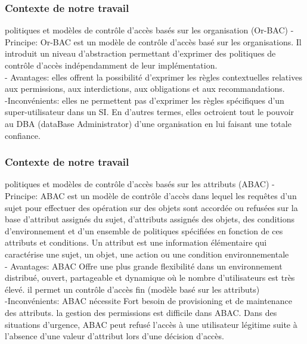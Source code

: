 \documentclass[10pt]{beamer}
\begin{document}
\begin{frame}
 \frametitle{Contexte de notre travail}
  \begin{block}{ politiques et modèles de contrôle d'accès basés sur les organisation (Or-BAC)}
    - Principe: Or-BAC est un modèle de contrôle d'accès basé sur les organisations. Il introduit un niveau d'abstraction permettant d'exprimer des politiques de contrôle d'accès indépendamment de leur implémentation. \\ 
    - Avantages: elles offrent la possibilité d'exprimer les règles contextuelles relatives aux permissions, aux interdictions, aux obligations et aux recommandations.\\
    -Inconvénients: elles ne permettent pas d'exprimer les règles spécifiques d'un super-utilisateur dans un SI. En d'autres termes, elles octroient tout le pouvoir au DBA (dataBase Administrator) d'une organisation en lui faisant une totale confiance. 
  \end{block}
\end{frame}

\begin{frame}
 \frametitle{Contexte de notre travail}
  \begin{block}{ politiques et modèles de contrôle d'accès basés sur les attributs (ABAC)}
    - Principe: ABAC est un modèle de contrôle d'accès dans lequel les requêtes d'un sujet pour effectuer des opération sur des objets sont accordée ou refusées sur la base d'attribut assignés du sujet, d'attributs assignés des objets, des conditions d'environnement et d'un ensemble de politiques spécifiées en fonction de ces attributs et conditions. Un attribut est une information élémentaire qui caractérise une sujet, un objet, une action ou une condition environnementale\\
    - Avantages: ABAC Offre une plus grande flexibilité dans un environnement distribué, ouvert, partageable et dynamique où le nombre d'utilisateurs est très élevé. il permet un contrôle d'accès fin (modèle basé sur les attributs)\\
    -Inconvénients: ABAC nécessite Fort besoin de provisioning et de maintenance des attributs. la gestion des permissions est difficile dans ABAC. Dans des situations d'urgence, ABAC peut refusé l'accès à une utilisateur légitime suite à l'absence d'une valeur d'attribut lors d'une décision d'accès.
 
  \end{block}
\end{frame}
\end{document}
